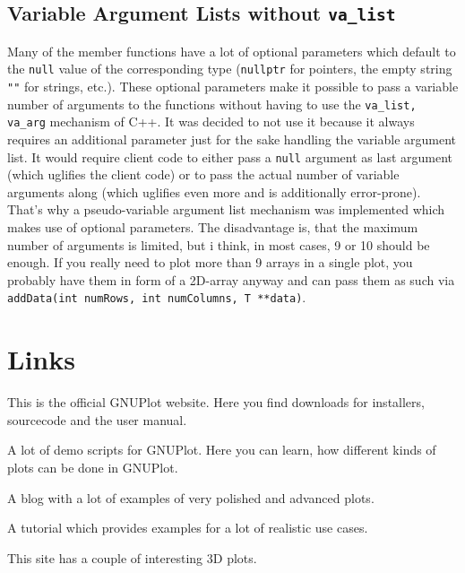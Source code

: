 \documentclass[11pt]{article}
\begin{document}
\subsection{Variable Argument Lists without \texttt{va\_list}}
Many of the member functions have a lot of optional parameters which default to the \texttt{null} value of the corresponding type (\texttt{nullptr} for pointers, the empty string \texttt{""} for strings, etc.). These optional parameters make it possible to pass a variable number of arguments to the functions without having to use the \texttt{va\_list, va\_arg} mechanism of C++. It was decided to not use it because it always requires an additional parameter just for the sake handling the variable argument list. It would require client code to either pass a \texttt{null} argument as last argument (which uglifies the client code) or to pass the actual number of variable arguments along (which uglifies even more and is additionally error-prone). That's why a pseudo-variable argument list mechanism was implemented which makes use of optional parameters. The disadvantage is, that the maximum number of arguments is limited, but i think, in most cases, 9 or 10 should be enough. If you really need to plot more than 9 arrays in a single plot, you probably have them in form of a 2D-array anyway and can pass them as such via \texttt{addData(int numRows, int numColumns, T **data)}.




\section{Links}

This is the official GNUPlot website. Here you find downloads for installers, sourcecode and the user manual.

A lot of demo scripts for GNUPlot. Here you can learn, how different kinds of plots can be done in GNUPlot.

 A blog with a lot of examples of very polished and advanced plots.

 A  tutorial which provides examples for a lot of realistic use cases.

 This site has a couple of interesting 3D plots.
\end{document}
